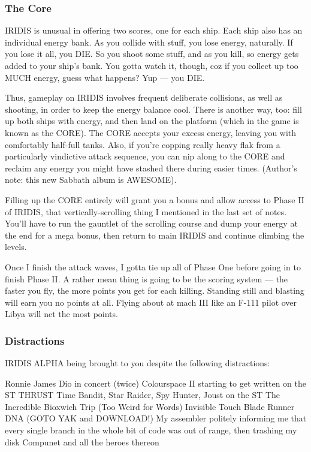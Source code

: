 \subsubsection{The Core}
IRIDIS is unusual in offering two scores, one for each ship. Each ship also has an individual energy bank. As you collide with stuff, you lose energy, naturally. If you lose it all, you DIE. So you shoot some stuff, and as you kill, so energy gets added to your ship's bank. You gotta watch it, though, coz if you collect up too MUCH energy, guess what happens? Yup — you DIE.

Thus, gameplay on IRIDIS involves frequent deliberate collisions, as well as shooting, in order to keep the energy balance cool. There is another way, too: fill up both ships with energy, and then land on the platform (which in the game is known as the CORE). The CORE accepts your excess energy, leaving you with comfortably half-full tanks. Also, if you're copping really heavy flak from a particularly vindictive attack sequence, you can nip along to the CORE and reclaim any energy you might have stashed there during easier times. (Author's note: this new Sabbath album is AWESOME).

Filling up the CORE entirely will grant you a bonus and allow access to Phase II of IRIDIS, that vertically-scrolling thing I mentioned in the last set of notes. You'll have to run the gauntlet of the scrolling course and dump your energy at the end for a mega bonus, then return to main IRIDIS and continue climbing the levels.

Once I finish the attack waves, I gotta tie up all of Phase One before going in to finish Phase II. A rather mean thing is going to be the scoring system — the faster you fly, the more points you get for each killing. Standing still and blasting will earn you no points at all. Flying about at mach III like an F-111 pilot over Libya will net the most points.

\subsubsection{Distractions}
IRIDIS ALPHA being brought to you despite the following distractions:

Ronnie James Dio in concert (twice)
Colourspace II starting to get written on the ST
THRUST
Time Bandit, Star Raider, Spy Hunter, Joust on the ST
The Incredible Bioxwich Trip (Too Weird for Words)
Invisible Touch
Blade Runner
DNA (GOTO YAK and DOWNLOAD!)
My assembler politely informing me that every single branch in the whole bit of code was out of range, then trashing my disk
Compunet and all the heroes thereon

